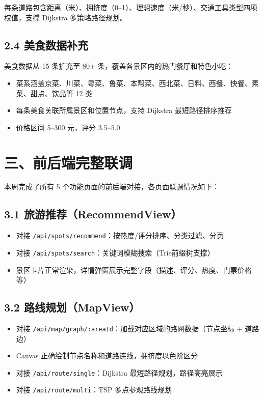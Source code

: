 \documentclass[12pt,a4paper]{article}
\begin{document}
每条道路包含距离（米）、拥挤度（0--1）、理想速度（米/秒）、交通工具类型四项权值，支撑 Dijkstra 多策略路径规划。

\subsection*{2.4 美食数据补充}

美食数据从 15 条扩充至 80+ 条，覆盖各景区内的热门餐厅和特色小吃：

\begin{itemize}[leftmargin=2em]
    \item 菜系涵盖京菜、川菜、粤菜、鲁菜、本帮菜、西北菜、日料、西餐、快餐、素菜、甜点、饮品等 12 类
    \item 每条美食关联所属景区和位置节点，支持 Dijkstra 最短路径排序推荐
    \item 价格区间 5--300 元，评分 3.5--5.0
\end{itemize}

\section*{三、前后端完整联调}

本周完成了所有 5 个功能页面的前后端对接，各页面联调情况如下：

\subsection*{3.1 旅游推荐（RecommendView）}

\begin{itemize}[leftmargin=2em]
    \item 对接 \texttt{/api/spots/recommend}：按热度/评分排序、分类过滤、分页
    \item 对接 \texttt{/api/spots/search}：关键词模糊搜索（Trie前缀树支撑）
    \item 景区卡片正常渲染，详情弹窗展示完整字段（描述、评分、热度、门票价格等）
\end{itemize}

\subsection*{3.2 路线规划（MapView）}

\begin{itemize}[leftmargin=2em]
    \item 对接 \texttt{/api/map/graph/:areaId}：加载对应区域的路网数据（节点坐标 + 道路边）
    \item Canvas 正确绘制节点名称和道路连线，拥挤度以色阶区分
    \item 对接 \texttt{/api/route/single}：Dijkstra 最短路径规划，路径高亮展示
    \item 对接 \texttt{/api/route/multi}：TSP 多点参观路线规划
\end{itemize}
\end{document}
